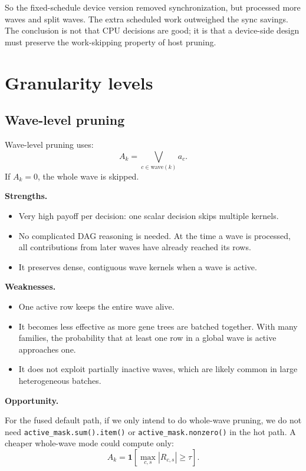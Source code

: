 \documentclass[11pt]{article}
\newcommand{\code}[1]{\texttt{#1}}
\begin{document}
So the fixed-schedule device version removed synchronization, but processed
more waves and split waves.  The extra scheduled work outweighed the sync
savings.  The conclusion is not that CPU decisions are good; it is that a
device-side design must preserve the work-skipping property of host pruning.

\section{Granularity levels}

\subsection{Wave-level pruning}

Wave-level pruning uses:
\[
  A_k = \bigvee_{c \in \mathrm{wave}(k)} a_c.
\]
If \(A_k = 0\), the whole wave is skipped.

\textbf{Strengths.}

\begin{itemize}[leftmargin=*]
\item Very high payoff per decision: one scalar decision skips multiple kernels.
\item No complicated DAG reasoning is needed.  At the time a wave is processed,
      all contributions from later waves have already reached its rows.
\item It preserves dense, contiguous wave kernels when a wave is active.
\end{itemize}

\textbf{Weaknesses.}

\begin{itemize}[leftmargin=*]
\item One active row keeps the entire wave alive.
\item It becomes less effective as more gene trees are batched together.  With
      many families, the probability that at least one row in a global wave is
      active approaches one.
\item It does not exploit partially inactive waves, which are likely common in
      large heterogeneous batches.
\end{itemize}

\textbf{Opportunity.}

For the fused default path, if we only intend to do whole-wave pruning, we do
not need \code{active\_mask.sum().item()} or \code{active\_mask.nonzero()} in
the hot path.  A cheaper whole-wave mode could compute only:
\[
  A_k = \mathbf{1}\left[\max_{c,s} |R_{c,s}| \ge \tau \right].
\]
\end{document}
